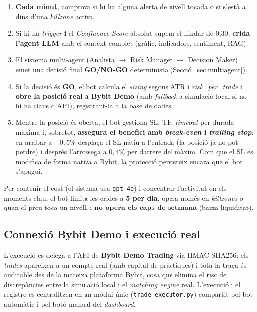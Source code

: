 \documentclass[12pt, a4paper]{report}
\begin{document}
\begin{enumerate}
  \item \textbf{Cada minut}, comprova si hi ha alguna alerta de nivell tocada o si s'està a dins d'una \textit{killzone} activa.
  \item Si hi ha \textit{trigger} \textbf{i} el \textit{Confluence Score} absolut supera el llindar de 0{,}30, \textbf{crida l'agent LLM} amb el context complet (gràfic, indicadors, sentiment, RAG).
  \item El sistema multi-agent (Analista $\to$ Risk Manager $\to$ Decision Maker) emet una decisió final \textbf{GO/NO-GO} determinista (Secció~\ref{sec:multiagent}).
  \item Si la decisió és \textbf{GO}, el bot calcula el \textit{sizing} segons ATR i \textit{risk\_per\_trade} i \textbf{obre la posició real a Bybit Demo} (amb \textit{fallback} a simulació local si no hi ha claus d'API), registrant-la a la base de dades.
  \item Mentre la posició és oberta, el bot gestiona SL, TP, \textit{timeout} per durada màxima i, sobretot, \textbf{assegura el benefici amb \textit{break-even} i \textit{trailing stop}}: en arribar a $+0{,}5\%$ desplaça el SL natiu a l'entrada (la posició ja no pot perdre) i després l'arrossega a $0{,}4\%$ per darrere del màxim. Com que el SL es modifica de forma nativa a Bybit, la protecció persisteix encara que el bot s'apagui.
\end{enumerate}

Per contenir el cost (el sistema usa \texttt{gpt-4o}) i concentrar l'activitat en els moments clau, el bot limita les crides a \textbf{5 per dia}, opera només en \textit{killzones} o quan el preu toca un nivell, i \textbf{no opera els caps de setmana} (baixa liquiditat).

\subsection{Connexió Bybit Demo i execució real}

L'execució es delega a l'API de \textbf{Bybit Demo Trading} via HMAC-SHA256: els \textit{trades} apareixen a un compte real (amb capital de pràctiques) i tota la traça és auditable des de la mateixa plataforma Bybit, cosa que elimina el risc de discrepàncies entre la simulació local i el \textit{matching engine} real. L'execució i el registre es centralitzen en un mòdul únic (\texttt{trade\_executor.py}) compartit pel bot automàtic i pel botó manual del \textit{dashboard}.
\end{document}
